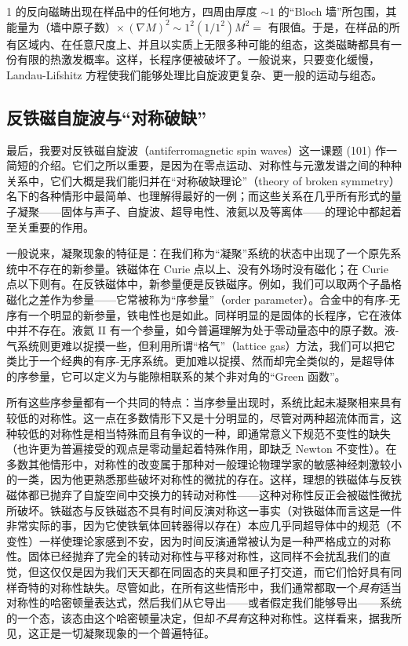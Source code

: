 

1 的反向磁畴出现在样品中的任何地方，四周由厚度 $\sim 1$ 的“Bloch 墙”所包围，其能量为（墙中原子数）$\times\,(\nabla M)^2 \sim 1^2(1/1^2)M^2 =$ 有限值。于是，在样品的所有区域内、在任意尺度上、并且以实质上无限多种可能的组态，这类磁畴都具有一份有限的热激发概率。这样，长程序便被破坏了。一般说来，只要变化缓慢，Landau-Lifshitz 方程使我们能够处理比自旋波更复杂、更一般的运动与组态。

\subsection{反铁磁自旋波与“对称破缺”}

最后，我要对反铁磁自旋波（antiferromagnetic spin waves）这一课题 (101) 作一简短的介绍。它们之所以重要，是因为在零点运动、对称性与元激发谱之间的种种关系中，它们大概是我们能归并在“对称破缺理论”（theory of broken symmetry）名下的各种情形中最简单、也理解得最好的一例；而这些关系在几乎所有形式的量子凝聚——固体与声子、自旋波、超导电性、液氦以及等离体——的理论中都起着至关重要的作用。

一般说来，凝聚现象的特征是：在我们称为“凝聚”系统的状态中出现了一个原先系统中不存在的新参量。铁磁体在 Curie 点以上、没有外场时没有磁化；在 Curie 点以下则有。在反铁磁体中，新参量便是反铁磁序。例如，我们可以取两个子晶格磁化之差作为参量——它常被称为“序参量”（order parameter）。合金中的有序-无序有一个明显的新参量，铁电性也是如此。同样明显的是固体的长程序，它在液体中并不存在。液氦 II 有一个参量，如今普遍理解为处于零动量态中的原子数。液-气系统则更难以捉摸一些，但利用所谓“格气”（lattice gas）方法，我们可以把它类比于一个经典的有序-无序系统。更加难以捉摸、然而却完全类似的，是超导体的序参量，它可以定义为与能隙相联系的某个非对角的“Green 函数”。

所有这些序参量都有一个共同的特点：当序参量出现时，系统比起未凝聚相来具有较低的对称性。这一点在多数情形下又是十分明显的，尽管对两种超流体而言，这种较低的对称性是相当特殊而且有争议的一种，即通常意义下规范不变性的缺失（也许更为普遍接受的观点是零动量起着特殊作用，即缺乏 Newton 不变性）。在多数其他情形中，对称性的改变属于那种对一般理论物理学家的敏感神经刺激较小的一类，因为他更熟悉那些破坏对称性的微扰的存在。这样，理想的铁磁体与反铁磁体都已抛弃了自旋空间中交换力的转动对称性——这种对称性反正会被磁性微扰所破坏。铁磁态与反铁磁态不具有时间反演对称这一事实（对铁磁体而言这是一件非常实际的事，因为它使铁氧体回转器得以存在）本应几乎同超导体中的规范（不变性）一样使理论家感到不安，因为时间反演通常被认为是一种严格成立的对称性。固体已经抛弃了完全的转动对称性与平移对称性，这同样不会扰乱我们的直觉，但这仅仅是因为我们天天都在同固态的夹具和匣子打交道，而它们恰好具有同样奇特的对称性缺失。尽管如此，在所有这些情形中，我们通常都取一个\emph{具有}适当对称性的哈密顿量表达式，然后我们从它导出——或者假定我们能够导出——系统的一个态，该态由这个哈密顿量决定，但却\emph{不具有}这种对称性。这样看来，据我所见，这正是一切凝聚现象的一个普遍特征。

